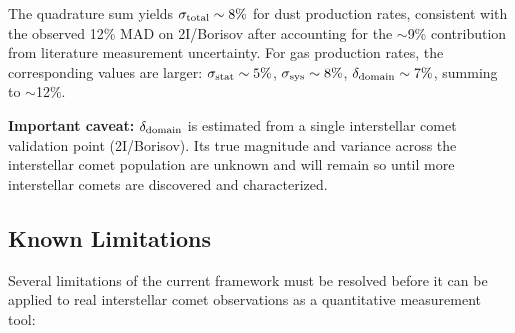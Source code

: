 \documentclass[preprint2]{aastex631}
\begin{document}
The quadrature sum yields $\sigma_{\rm total} \sim 8\%$ for dust production rates, consistent with the observed 12\% MAD on 2I/Borisov after accounting for the $\sim$9\% contribution from literature measurement uncertainty. For gas production rates, the corresponding values are larger: $\sigma_{\rm stat} \sim 5\%$, $\sigma_{\rm sys} \sim 8\%$, $\delta_{\rm domain} \sim 7\%$, summing to $\sim$12\%.

\textbf{Important caveat:} $\delta_{\rm domain}$ is estimated from a single interstellar comet validation point (2I/Borisov). Its true magnitude and variance across the interstellar comet population are unknown and will remain so until more interstellar comets are discovered and characterized.

\subsection{Known Limitations}

Several limitations of the current framework must be resolved before it can be applied to real interstellar comet observations as a quantitative measurement tool:
\end{document}

